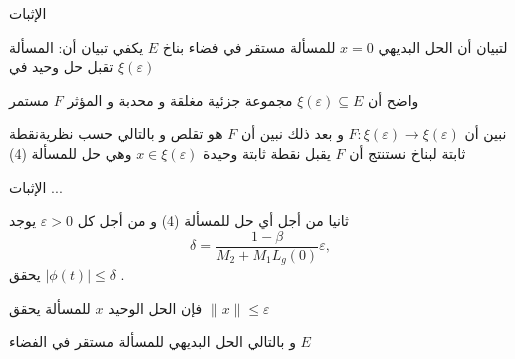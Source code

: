 \documentclass[dvipsnames,mathserif]{beamer}
\begin{document}
\begin{frame}{الإثبات}
\begin{tcolorbox}[enhanced,arc=3mm,boxrule=1.5mm,boxsep=1.5mm,
colback=yellow!20!white,
colframe=blue,
borderline={1mm}{1mm}{yellow},
borderline={1mm}{2mm}{green} ]
لتبيان أن الحل البديهي $x=0$ للمسألة مستقر في فضاء بناخ $E$ يكفي تبيان أن:
المسألة تقبل حل وحيد في 
$\xi\left( \varepsilon\right)$

واضح أن 
$\xi\left( \varepsilon\right) \subseteq E$
مجموعة جزئية مغلقة و محدبة  و المؤثر $F$ مستمر 

نبين أن
$F:\xi\left( \varepsilon\right) \rightarrow \xi\left( \varepsilon\right)$
و بعد ذلك نبين أن $F$ هو تقلص و بالتالي حسب نظريةنقطة ثابتة لبناخ نستنتج أن $F$ يقبل نقطة ثابتة وحيدة 
$x\in \xi\left( \varepsilon\right)$
 وهي حل للمسألة (4) 
 \end{tcolorbox}
 \end{frame}
 \begin{frame}{الإثبات ...}
 \begin{tcolorbox}[enhanced,arc=3mm,boxrule=1.5mm,boxsep=1.5mm,
colback=yellow!20!white,
colframe=blue,
borderline={1mm}{1mm}{yellow},
borderline={1mm}{2mm}{green} ]
 ثانيا من أجل أي حل للمسألة (4) و من أجل كل 
 $\varepsilon>0$
يوجد 
$$\delta  = \dfrac{{1 - \beta }}{{{M_2} + {M_1}{L_g}(0)}}\varepsilon ,$$
يحقق
$\big| {\phi (t)} \big| \le \delta $
.

فإن الحل الوحيد $x$ للمسألة  يحقق 
$\| x\| \le \varepsilon$

و بالتالي الحل البديهي  للمسألة مستقر  في الفضاء $E$
\end{tcolorbox}
\end{frame}
\end{document}
